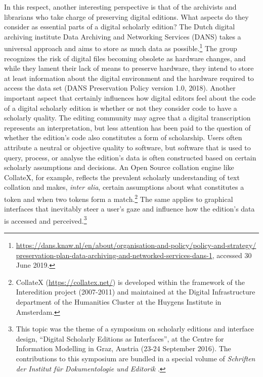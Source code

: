 \begin{paper}
In this respect, another interesting perspective is that of the
archivists and librarians who take charge of preserving digital
editions. What aspects do they consider as essential parts of a digital
scholarly edition? The Dutch digital archiving institute Data Archiving
and Networking Services (DANS) takes a universal approach and aims to
store as much data as possible.\footnote{\href{https://dans.knaw.nl/en/about/organisation-and-policy/policy-and-strategy/preservation-plan-data-archiving-and-networked-services-dans-1}{https://dans.knaw.nl/en/about/organisation-and-policy/policy-and-strategy/ preservation-plan-data-archiving-and-networked-services-dans-1}, accessed 30 June 2019.} The group recognizes the risk of digital files becoming obsolete as
hardware changes, and while they lament their lack of means to preserve
hardware, they intend to store at least information about the digital
environment and the hardware required to access the data set (DANS
Preservation Policy version 1.0, 2018). Another important aspect that
certainly influences how digital editors feel about the code of a
digital scholarly edition is whether or not they consider code to have a
scholarly quality. The editing community may agree that a digital
transcription represents an interpretation, but less attention has been
paid to the question of whether the edition's code also constitutes a
form of scholarship. Users often attribute a neutral or objective
quality to software, but software that is used to query, process, or
analyse the edition's data is often constructed based on certain
scholarly assumptions and decisions. An Open Source collation engine
like CollateX, for example, reflects the prevalent scholarly
understanding of text collation and makes, \emph{inter alia}, certain
assumptions about what constitutes a token and when two tokens form a
match.\footnote{CollateX
  (\href{https://collatex.net/}{{https://collatex.net/}}) is developed
  within the framework of the Interedition project (2007-2011) and
  maintained at the Digital Infrastructure department of the Humanities
  Cluster at the Huygens Institute in Amsterdam.} The same applies to graphical interfaces that
inevitably steer a user's gaze and influence how the edition's data is
accessed and perceived.\footnote{This topic was the theme of a symposium
  on scholarly editions and interface design, ``Digital Scholarly
  Editions as Interfaces'', at the Centre for Information Modelling in
  Graz, Austria (23-24 September 2016). The contributions to this
  symposium are bundled in a special volume of \emph{Schriften der
  Institut für Dokumentologie und Editorik} \citep{bleier_digital_2018}.}


\end{paper}
